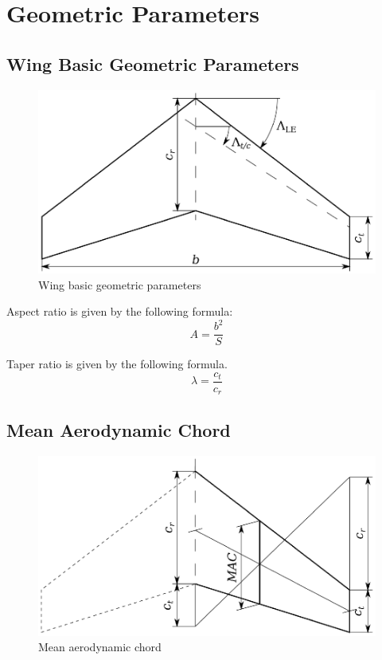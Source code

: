 \chapter{Geometric Parameters}

\section{Wing Basic Geometric Parameters}

\begin{figure}
  \centering
  \includegraphics[width=120mm]{images/wing_geometric_parameters.eps}
  \caption{Wing basic geometric parameters}
\end{figure}

Aspect ratio is given by the following formula: \cite{Raymer1992}
\begin{equation}
  A = \frac{b^2}{S}
\end{equation}

Taper ratio is given by the following formula. \cite{Raymer1992}
\begin{equation}
  \lambda = \frac{c_t}{c_r}
\end{equation}

\section{Mean Aerodynamic Chord}

\begin{figure}
  \centering
  \includegraphics[width=120mm]{images/wing_mean_aerodynamic_chord.eps}
  \caption{Mean aerodynamic chord}
\end{figure}

